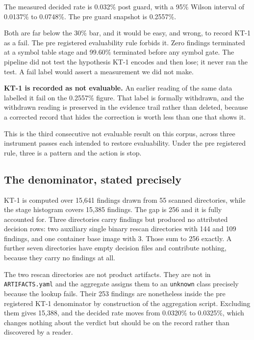 The measured decided rate is 0.032\% post guard, with a 95\% Wilson interval of
0.0137\% to 0.0748\%. The pre guard snapshot is 0.2557\%.

Both are far below the 30\% bar, and it would be easy, and wrong, to record KT-1
as a fail. The pre registered evaluability rule forbids it. Zero findings
terminated at a symbol table stage and 99.60\% terminated before any symbol gate.
The pipeline did not test the hypothesis KT-1 encodes and then lose; it never ran
the test. A fail label would assert a measurement we did not make.

\textbf{KT-1 is recorded as not evaluable.} An earlier reading of the same data
labelled it fail on the 0.2557\% figure. That label is formally withdrawn, and
the withdrawn reading is preserved in the evidence trail rather than deleted,
because a corrected record that hides the correction is worth less than one that
shows it.

This is the third consecutive not evaluable result on this corpus, across three
instrument passes each intended to restore evaluability. Under the pre registered
rule, three is a pattern and the action is stop.

\subsection{The denominator, stated precisely}
\label{sec:denominator}

KT-1 is computed over 15,641 findings drawn from 55 scanned directories, while
the stage histogram covers 15,385 findings. The gap is 256 and it is fully
accounted for. Three directories carry findings but produced no attributed
decision rows: two auxiliary single binary rescan directories with 144 and 109
findings, and one container base image with 3. Those sum to 256 exactly. A
further seven directories have empty decision files and contribute nothing,
because they carry no findings at all.

The two rescan directories are not product artifacts. They are not in
\texttt{ARTIFACTS.yaml} and the aggregate assigns them to an \texttt{unknown}
class precisely because the lookup fails. Their 253 findings are nonetheless
inside the pre registered KT-1 denominator by construction of the aggregation
script. Excluding them gives 15,388, and the decided rate moves from 0.0320\% to
0.0325\%, which changes nothing about the verdict but should be on the record
rather than discovered by a reader.

